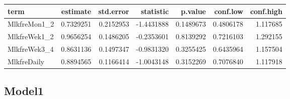 \documentclass[]{article}
\newenvironment{Shaded}{\begin{snugshade}}{\end{snugshade}}
\newcommand{\DataTypeTok}[1]{\textcolor[rgb]{0.13,0.29,0.53}{#1}}
\newcommand{\KeywordTok}[1]{\textcolor[rgb]{0.13,0.29,0.53}{\textbf{#1}}}
\newcommand{\NormalTok}[1]{#1}
\newcommand{\OperatorTok}[1]{\textcolor[rgb]{0.81,0.36,0.00}{\textbf{#1}}}
\newcommand{\OtherTok}[1]{\textcolor[rgb]{0.56,0.35,0.01}{#1}}
\newcommand{\StringTok}[1]{\textcolor[rgb]{0.31,0.60,0.02}{#1}}
\begin{document}
\begin{Shaded}
\end{Shaded}

\begin{longtable}[]{@{}lrrrrrr@{}}
\toprule
term & estimate & std.error & statistic & p.value & conf.low &
conf.high\tabularnewline
\midrule
\endhead
MlkfreMon1\_2 & 0.7329251 & 0.2152953 & -1.4431888 & 0.1489673 &
0.4806178 & 1.117685\tabularnewline
MlkfreWek1\_2 & 0.9656254 & 0.1486205 & -0.2353601 & 0.8139292 &
0.7216103 & 1.292155\tabularnewline
MlkfreWek3\_4 & 0.8631136 & 0.1497347 & -0.9831320 & 0.3255425 &
0.6435964 & 1.157504\tabularnewline
MlkfreDaily & 0.8894565 & 0.1166414 & -1.0043148 & 0.3152269 & 0.7076840
& 1.117918\tabularnewline
\bottomrule
\end{longtable}

\hypertarget{model1-3}{%
\subsection{Model1}\label{model1-3}}

\begin{Shaded}
\end{Shaded}
\end{document}
